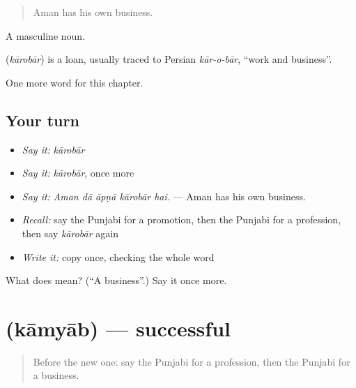 \begin{quote}
Aman has his own business.
\end{quote}

A masculine noun.

\begin{cousinweb}
\textbf{} (\emph{kārobār}) is a loan, usually traced to Persian \emph{kār-o-bār}, \textquotedblleft{}work and business\textquotedblright{}.
\end{cousinweb}

\begin{grammarlens}[title={What you've built}]
One more word for this chapter.
\end{grammarlens}

\subsection*{Your turn}
\begin{itemize}
\raggedright
  \item \emph{Say it:} \emph{kārobār}
  \item \emph{Say it:} \emph{kārobār}, once more
  \item \emph{Say it:} \emph{Aman dā āpṇā kārobār hai.} — Aman has his own business.
  \item \emph{Recall:} say the Punjabi for a promotion, then the Punjabi for a profession, then say \emph{kārobār} again
  \item \emph{Write it:} copy \textbf{} once, checking the whole word
\end{itemize}

\begin{tcolorbox}[breakable,colback=teal!4,colframe=teal!35!black,title={Before you move on}]
What does  mean? (\textquotedblleft{}A business\textquotedblright{}.) Say it once more.
\end{tcolorbox}
\section[\texorpdfstring{\pa{ਕਾਮਯਾਬ} (kāmyāb)}{ਕਾਮਯਾਬ (kāmyāb)}]{ (kāmyāb) — successful}

\label{lesson:PA-C364-kamyab}



\begin{quote}
Before the new one: say the Punjabi for a profession, then the Punjabi for a business.
\end{quote}

